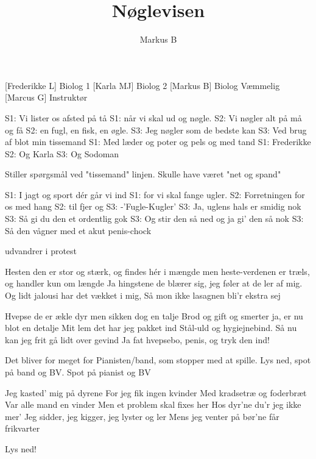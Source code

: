 \documentclass[a4paper,11pt]{article}
\title{Nøglevisen}
\author{Markus B}
\begin{document}
\maketitle

\begin{roles}
[Frederikke L] Biolog 1
[Karla MJ] Biolog 2
[Markus B] Biolog Væmmelig
[Marcus G] Instruktør
\end{roles}

\begin{song}


S1: Vi lister os afsted på tå 
S1: når vi skal ud og nøgle.
S2: Vi nøgler alt på må og få
S2: en fugl, en fisk, en øgle.
S3: Jeg nøgler som de bedste kan
S3: Ved brug af blot min tissemand 
S1: Med læder og poter og pels og med tand
S1: Frederikke S2: Og Karla S3: Og Sodoman 

 Stiller spørgsmål ved "tissemand" linjen. Skulle have været "net og spand" 

S1: I jagt og sport dér går vi ind 
S1: for vi skal fange ugler.
S2: Forretningen for os med hang 
S2: til fjer og 
S3: -'Fugle-Kugler'
S3: Ja, uglens hals er smidig nok
S3: Så gi du den et ordentlig gok
S3: Og stir den så ned og ja gi' den så nok
S3: Så den vågner med et akut penis-chock

 udvandrer i protest

Hesten den er stor og stærk, 
og findes hér i mængde
men heste-verdenen er træls, 
og handler kun om længde
Ja hingstene de blærer sig, 
jeg føler at de ler af mig.
Og lidt jalousi har det vækket i mig,
Så mon ikke lasagnen bli'r ekstra sej

Hvepse de er ækle dyr 
men sikken dog en talje
Brod og gift og smerter ja, 
er nu blot en detalje
Mit lem det har jeg pakket ind
Stål-uld og hygiejnebind.
Så nu kan jeg frit gå lidt over gevind
Ja fat hvepsebo, penis, og tryk den ind!

\scene Det bliver for meget for Pianisten/band, som stopper med at spille.
\scene Lys ned, spot på band og BV.
\scene Spot på pianist og BV

Jeg kasted' mig på dyrene 
For jeg fik ingen kvinder
Med kradsetræ og foderbræt 
Var alle mand en vinder
Men et problem skal fixes her
Hos dyr'ne du'r jeg ikke mer'
Jeg sidder, jeg kigger, jeg lyster og ler
Mens jeg venter på bør'ne får frikvarter

\scene Lys ned!

\end{song}
\end{document}
